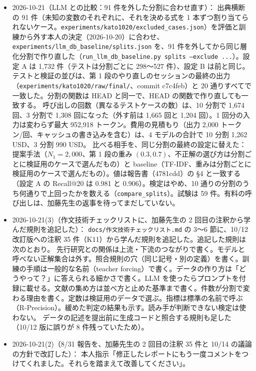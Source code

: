 \documentclass[11pt,a4paper]{jsarticle}
\begin{document}
\begin{itemize}[nosep]
  \item 2026-10-21（LLM との比較：91 件を外した分割に合わせ直す）：
    出典横断の 91 件（未知の変数のそれぞれに、それを決める式を 1 本ずつ割り当てられないケース。\texttt{experiments/kato1020/excluded\_cases.json}）を評価と訓練から外す本人の決定（2026-10-20）に合わせ、\texttt{experiments/llm\_db\_baseline/splits.json} を、91 件を外してから同じ層化分割で作り直した（\texttt{run\_llm\_db\_baseline.py splits --exclude ...}）。設定 A は 1{,}732 件（テストは分割ごとに 298〜527 件）、設定 B は前と同じ。テストと検証の並びは、第 1 段のやり直しのセッションの最終の出力（\texttt{experiments/kato1020/raw/final/}、commit c7c4feb）と 20 通りすべてで一致した。分割の関数は HEAD と同一で、HEAD の関数で作り直しても一致する。
    呼び出しの回数（異なるテストケースの数）は、10 分割で 1{,}674 回、3 分割で 1{,}308 回になった（外す前は 1{,}665 回と 1{,}204 回）。1 回分の入力は変わらず最大 952{,}918 トークン。費用の見積もり（出力 2{,}000 トークン/回、キャッシュの書き込みを含む）は、4 モデルの合計で 10 分割 1{,}262 USD、3 分割 990 USD。
    比べる相手を、同じ分割の最終の設定に替えた：提案手法（$N_1 = 2{,}000$、第 1 段の重み $(0.3, 0.7)$、不正解の選び方は分割ごとに検証用のケースで選んだもの）と baseline（TF-IDF、重みは分割ごとに検証用のケースで選んだもの）。値は報告書（4781cdd）の \S 4 と一致する（設定 A の Recall@20 は 0.981 と 0.906）。検定はやめ、10 通りの分割のうち何通りで上回ったかを数える（\texttt{compare\_splits}）。試験は 59 件。有料の呼び出しは、加藤先生の返事を待ってまだしていない。
  \item 2026-10-21(3)（作文技術チェックリストに、加藤先生の 2 回目の注釈から学んだ規則を追記した）：
    \texttt{docs/作文技術チェックリスト.md} の 3〜6 節に、10/12 改訂版への注釈 35 件（K11）から学んだ規則を追記した。追記した規則は次のとおり。
    先行研究との関係は上流・下流のつながりで書く。モデルと呼べない正解集合は外す。照合規則の穴（同じ記号・別の定義）を書く。訓練の手順は一般的な名前（teacher forcing）で書く。データの作り方は「どうやって？」に答えられる細かさで書く。LLM を使ったらプロンプトを付録に載せる。文献の集め方は並べ方と止めた基準まで書く。件数が分割で変わる理由を書く。定数は検証用のデータで選ぶ。指標は標準の名前で呼ぶ（R-Precision）。緩めた判定の結果も示す。読み手が判断できない検定は使わない。
    データの記述を提出前に生成コードと照合する規則も足した（10/12 版に誤りが 8 件残っていたため）。
  \item 2026-10-21(2)（8/31 報告を、加藤先生の 2 回目の注釈 35 件と 10/14 の議論の方針で改訂した）：
    本人指示「修正したレポートにもう一度コメントをつけてくれました。それらを踏まえて改善してください」。

\end{itemize}
\end{document}
